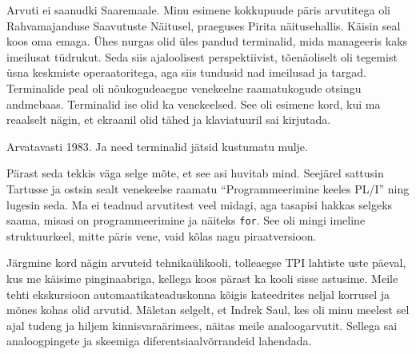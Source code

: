 \label{cptr:mast}


Arvuti ei saanudki Saaremaale. Minu esimene kokkupuude päris arvutitega oli 
Rahvamajanduse Saavutuste Näitusel, praeguses Pirita näitusehallis. Käisin 
seal koos oma emaga. Ühes nurgas olid üles pandud 
terminalid, mida manageeris kaks imeilusat tüdrukut. Seda siis ajaloolisest perspektiivist, tõenäoliselt oli tegemist üsna keskmiste 
operaatoritega, aga siis tundusid nad imeilusad ja targad. Terminalide peal oli 
nõukogudeaegne venekeelne raamatukogude otsingu andmebaas. Terminalid ise olid ka 
venekeelsed. See oli esimene kord, kui ma reaalselt nägin, et ekraanil olid 
tähed ja klaviatuuril sai kirjutada. 


Arvatavasti 1983. Ja need terminalid jätsid kustumatu mulje. 


Pärast seda tekkis väga selge mõte, et see asi huvitab mind. 
Seejärel sattusin Tartusse ja ostsin sealt venekeelse 
raamatu \enquote{Programmeerimine keeles PL/I} ning lugesin 
seda. Ma ei teadnud arvutitest veel midagi, aga tasapisi hakkas selgeks saama, 
misasi on programmeerimine ja näiteks \verb|for|. See oli mingi imeline struktuurkeel, mitte päris vene, 
vaid kõlas nagu piraatversioon.

Järgmine kord nägin arvuteid tehnikaülikooli, tolleaegse TPI lahtiste uste päeval, kus me käisime 
pinginaabriga, kellega koos pärast ka kooli sisse astusime. 
Meile tehti ekskursioon automaatikateaduskonna kõigis 
kateedrites neljal 
korrusel ja mõnes kohas olid arvutid. Mäletan selgelt, et Indrek 
Saul, kes oli minu meelest sel ajal tudeng ja hiljem 
kinnisvaraärimees, näitas meile analoogarvutit. Sellega
sai analoogpingete ja skeemiga diferentsiaalvõrrandeid lahendada.


